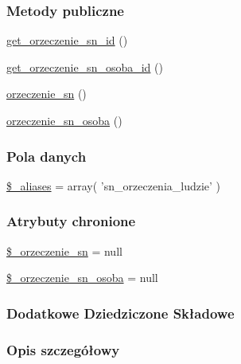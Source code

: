 \subsubsection*{Metody publiczne}
\begin{DoxyCompactItemize}
\item 
\hyperlink{classep___s_n___orzeczenie___autor_a48819f0e56cb11707ba89150dd449c71}{get\-\_\-orzeczenie\-\_\-sn\-\_\-id} ()
\item 
\hyperlink{classep___s_n___orzeczenie___autor_a8a91a727290a24c4f12d72adda38d3df}{get\-\_\-orzeczenie\-\_\-sn\-\_\-osoba\-\_\-id} ()
\item 
\hyperlink{classep___s_n___orzeczenie___autor_ad3ca9a024234af7b90b52e8edb3406ff}{orzeczenie\-\_\-sn} ()
\item 
\hyperlink{classep___s_n___orzeczenie___autor_abedbfb98ce259de97cc4ddfd5496797c}{orzeczenie\-\_\-sn\-\_\-osoba} ()
\end{DoxyCompactItemize}
\subsubsection*{Pola danych}
\begin{DoxyCompactItemize}
\item 
\hyperlink{classep___s_n___orzeczenie___autor_ab4e31d75f0bc5d512456911e5d01366b}{\$\-\_\-aliases} = array( 'sn\-\_\-orzeczenia\-\_\-ludzie' )
\end{DoxyCompactItemize}
\subsubsection*{Atrybuty chronione}
\begin{DoxyCompactItemize}
\item 
\hyperlink{classep___s_n___orzeczenie___autor_a03da9aa4f10fbe1d2b4ef32521cbedb0}{\$\-\_\-orzeczenie\-\_\-sn} = null
\item 
\hyperlink{classep___s_n___orzeczenie___autor_a9ede817d229955b98ebe3e10f5a45e94}{\$\-\_\-orzeczenie\-\_\-sn\-\_\-osoba} = null
\end{DoxyCompactItemize}
\subsubsection*{Dodatkowe Dziedziczone Składowe}


\subsubsection{Opis szczegółowy}


